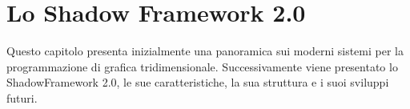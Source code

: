 
\chapter{Lo Shadow Framework 2.0}
\label{ch:shadowframework}
Questo capitolo presenta inizialmente una panoramica sui moderni sistemi per la programmazione di grafica tridimensionale. Successivamente viene presentato lo ShadowFramework 2.0, le sue caratteristiche, la sua struttura e i suoi sviluppi futuri.

